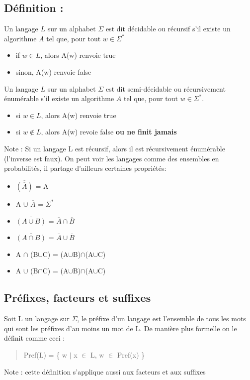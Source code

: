 \documentclass{article}
\begin{document}
\subsection{Définition :}
Un langage $L$ sur un alphabet $\Sigma$ est dit décidable ou récursif s'il existe un algorithme $A$ tel que, pour tout $w \in \Sigma^{*}$
\begin{itemize}
    \item if $w \in L$, alors A(w) renvoie true
    \item sinon, A(w) renvoie false
\end{itemize}
Un langage $L$ sur un alphabet $\Sigma$ est dit semi-décidable ou récursivement énumérable s'il existe un algorithme $A$ tel que, pour tout $w \in \Sigma^{*}$.
\begin{itemize}
    \item si $w \in L$, alors A(w) renvoie true
    \item si $w \notin L$, alors A(w) revoie false \textbf{ou ne finit jamais}
\end{itemize}
Note : Si un langage L est récursif, alors il est récursivement énumérable (l'inverse est faux).\newpage
On peut voir les langages comme des ensembles en probabilités, il partage d'ailleurs certaines propriétés:
\begin{itemize}
    \item $\overline{(\overline{A})}$ = A
    \item A $\cup$ $\overline{A}$ = $\Sigma^{*}$
    \item $\overline{(A \cup B)}$ = $\overline{A}\cap\overline{B}$
    \item $\overline{(A \cap B)}$ = $\overline{A} \cup \overline{B}$
    \item A $\cap$ (B$\cup$C) = (A$\cup$B)$\cap$(A$\cup$C)
    \item A $\cup$ (B$\cap$C) = (A$\cup$B)$\cap$(A$\cup$C)
\end{itemize}
\subsection{Préfixes, facteurs et suffixes}
Soit L un langage sur $\Sigma$, le préfixe d'un langage est l'ensemble de tous les mots qui sont les préfixes d'au moins un mot de L. De manière plus formelle on le définit comme ceci :
\begin{quote}
    Pref(L) = \{ w $|$ x $\in$ L, w $\in$ Pref(x) \} 
\end{quote}
Note : cette définition s'applique aussi aux facteurs et aux suffixes
\end{document}

